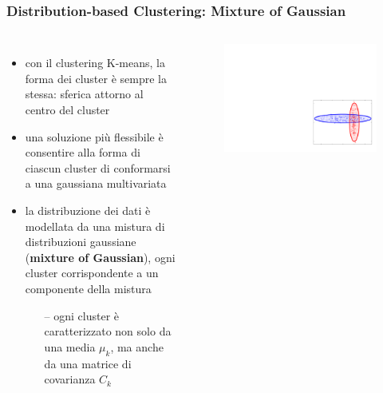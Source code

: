 \begin{frame}

	\frametitle{{\color{GradientDescentDiagramOrange}Distribution-based Clustering}: Mixture of Gaussian}

		\begin{columns}

			\begin{itemize}
				\item con il clustering K-means, la forma dei cluster è sempre la stessa: sferica attorno al centro del cluster
				\item una soluzione più flessibile è consentire alla forma di ciascun cluster di conformarsi a una gaussiana multivariata
				\item la distribuzione dei dati è modellata da una mistura di distribuzioni gaussiane (\textbf{mixture of Gaussian}), ogni cluster corrispondente a un componente della mistura
					\begin{itemize}
						\item[--] ogni cluster è caratterizzato non solo da una media $\mu_k$, ma anche da una matrice di covarianza $C_k$
					\end{itemize}
			\end{itemize}

			\begin{figure}[!htbp]
				\centering
				\includegraphics[angle=0,width=1.0\linewidth]{images/unsupervised/gaussian_mixture/gmm_example.pdf}
			\end{figure}

		\end{columns}

\end{frame}


